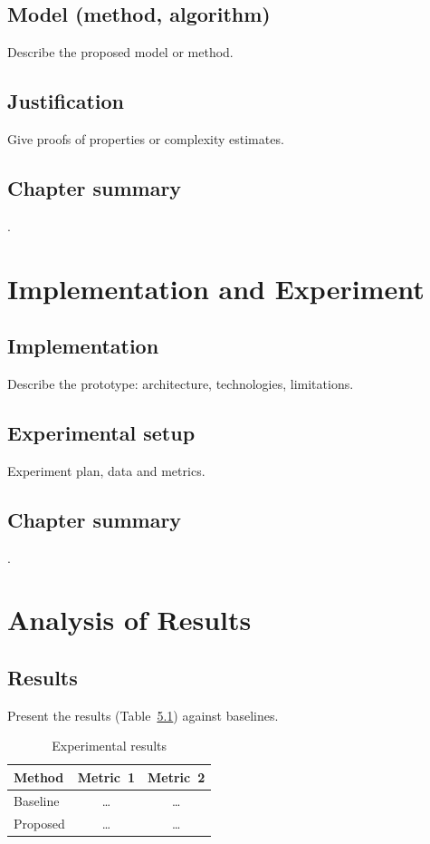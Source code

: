 \documentclass[12pt,a4paper]{extreport}
\begin{document}
\section{Model (method, algorithm)}
Describe the proposed model or method.

\section{Justification}
Give proofs of properties or complexity estimates.

\section{Chapter summary}
.

\clearpage
\chapter{Implementation and Experiment}
\section{Implementation}
Describe the prototype: architecture, technologies, limitations.

\section{Experimental setup}
Experiment plan, data and metrics.

\section{Chapter summary}
.

\clearpage
\chapter{Analysis of Results}
\section{Results}
Present the results (Table~\ref{tab:results}) against baselines.

\begin{table}[H]
\caption{Experimental results}
\label{tab:results}
\centering
\begin{tabular}{|>{\raggedright\arraybackslash}p{5cm}|c|c|}
\hline
\textbf{Method} & \textbf{Metric~1} & \textbf{Metric~2} \\
\hline
Baseline & \ldots & \ldots \\
\hline
Proposed & \ldots & \ldots \\
\hline
\end{tabular}
\end{table}
\end{document}
